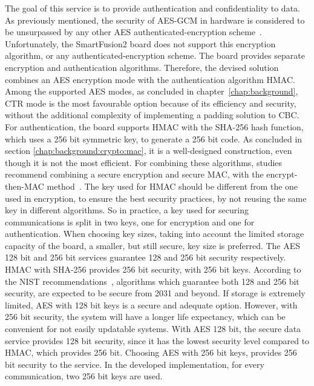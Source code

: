 The goal of this service is to provide authentication and confidentiality to data.
As previously mentioned, the security of \ac{AES}-\ac{GCM} in hardware is considered to be unsurpassed by any other \ac{AES} authenticated-encryption scheme~\cite{aesmodes}.
Unfortunately, the SmartFusion2 board does not support this encryption algorithm, or any authenticated-encryption scheme. The board provides separate encryption and authentication algorithms.
Therefore, the devised solution combines an \ac{AES} encryption mode with the authentication algorithm \ac{HMAC}. Among the supported \ac{AES} modes, as concluded in chapter~\ref{chap:background}, CTR mode is the most favourable option because of its efficiency and security, without the additional complexity of implementing a padding solution to \ac{CBC}.
For authentication, the board supports \ac{HMAC} with the \ac{SHA}-256 hash function, which uses a 256 bit symmetric key, to generate a 256 bit code. As concluded in section \ref{chap:background:crypto:mac}, it is a well-designed construction, even though it is not the most efficient.
For combining these algorithms, studies recommend combining a secure encryption and secure \ac{MAC}, with the encrypt-then-MAC method~\cite{encryptmacorder}.
The key used for HMAC should be different from the one used in encryption, to ensure the best security practices, by not reusing the same key in different algorithms. So in practice, a key used for securing communications is split in two keys, one for encryption and one for authentication.
When choosing key sizes, taking into account the limited storage capacity of the board, a smaller, but still secure, key size is preferred. The \ac{AES} 128 bit and 256 bit services guarantee 128 and 256 bit security respectively. HMAC with SHA-256 provides 256 bit security, with 256 bit keys. According to the \ac{NIST} recommendations~\cite{nistRecommendations}, algorithms which guarantee both 128 and 256 bit security, are expected to be secure from 2031 and beyond. If storage is extremely limited, AES with 128 bit keys is a secure and adequate option. However, with 256 bit security, the system will have a longer life expectancy, which can be convenient for not easily updatable systems.
With AES 128 bit, the secure data service provides 128 bit security, since it has the lowest security level compared to HMAC, which provides 256 bit. Choosing AES with 256 bit keys, provides 256 bit security to the service.
In the developed implementation, for every communication, two 256 bit keys are used.

